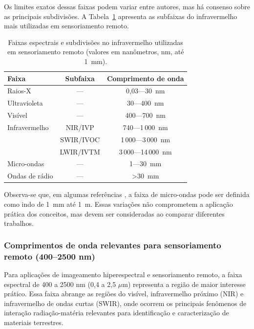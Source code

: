 Os limites exatos dessas faixas podem variar entre autores, mas há consenso
sobre as principais subdivisões. A Tabela~\ref{tab:faixas_espectrais_iv}
apresenta as subfaixas do infravermelho mais utilizadas em sensoriamento
remoto.

\begin{table}[htbp]
    \centering
    \caption{Faixas espectrais e subdivisões no infravermelho utilizadas em
    sensoriamento remoto (valores em nanômetros, nm, até 1~mm).}
    \label{tab:faixas_espectrais_iv}
    \begin{tabular}{lcc}
    \toprule
    \textbf{Faixa} & \textbf{Subfaixa} & \textbf{Comprimento de onda} \\
    \midrule
    Raios-X & --- & 0{,}03---30~nm \\
    Ultravioleta & --- & 30---400~nm \\
    Visível & --- & 400---700~nm \\
    Infravermelho & NIR/IVP & 740---1\,000~nm \\
    & SWIR/IVOC & 1\,000---3\,000~nm \\
    & LWIR/IVTM & 3\,000---14\,000~nm \\
    Micro-ondas & --- & 1---30~mm \\
    Ondas de rádio & --- & >30~mm \\
    \bottomrule
    \end{tabular}
\end{table}

Observa-se que, em algumas referências \cite{Lorenzzetti2015, Baptista2019}, 
a faixa de micro-ondas pode ser
definida como indo de 1~mm até 1~m. Essas variações não comprometem a
aplicação prática dos conceitos, mas devem ser consideradas ao comparar
diferentes trabalhos.

\subsubsection{Comprimentos de onda relevantes para sensoriamento remoto
(400--2500 nm)}

Para aplicações de imageamento hiperespectral e sensoriamento remoto, a faixa
espectral de 400 a 2500 nm (0,4 a 2,5 $\mu$m) representa a região de maior
interesse prático. Essa faixa abrange as regiões do visível, infravermelho
próximo (NIR) e infravermelho de ondas curtas (SWIR), onde ocorrem os
principais fenômenos de interação radiação-matéria relevantes para
identificação e caracterização de materiais terrestres.

